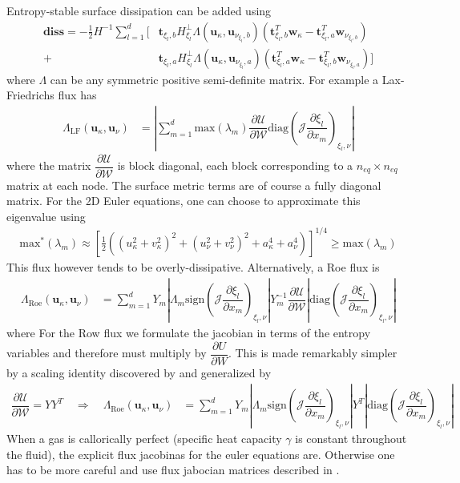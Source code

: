 \documentclass[12pt,a4paper]{article}
\newcommand{\pder}[2][]{\dfrac{\partial #1}{\partial #2}} %
\newcommand{\fn}[1]{\mathcal{#1}} %
\newcommand{\fnb}[1]{\bm{\mathcal{#1}}} %
\begin{document}
Entropy-stable surface dissipation can be added using
\begin{align*}
 \textbf{diss} = - \frac{1}{2} H^{-1} \sum_{l=1}^d \bigg[ & \bm{t}_{\xi_l, b} H^{\bot}_{\xi_l} \Lambda ( \bm{u}_\kappa , \bm{u}_{\nu_{\xi_l},b} ) 
 \left( \bm{t}_{\xi_l, b}^T \bm{w}_\kappa - \bm{t}_{\xi_l, a}^T \bm{w}_{\nu_{\xi_l , b}} \right) \\ + 
& \bm{t}_{\xi_l, a} H^{\bot}_{\xi_l} \Lambda ( \bm{u}_\kappa , \bm{u}_{\nu_{\xi_l},a} ) 
 \left( \bm{t}_{\xi_l, a}^T \bm{w}_\kappa - \bm{t}_{\xi_l, b}^T \bm{w}_{\nu_{\xi_l , a}} \right) \bigg]
\end{align*}
where $\Lambda$ can be any symmetric positive semi-definite matrix. For example a Lax-Friedrichs flux has
\begin{align*}
\Lambda_{\text{LF}} ( \bm{u}_\kappa , \bm{u}_\nu ) &= \left\vert \sum_{m=1}^d \text{max} \left( {\lambda_m} \right) \pder[\fnb{U}]{\fnb{W}} \text{diag} \left( \fn{J} \pder[\xi_l]{x_m} \right)_{\xi_l,\nu} \right\vert 
\end{align*}
where the matrix $\pder[\fnb{U}]{\fnb{W}}$ is block diagonal, each block corresponding to a $n_{eq} \times n_{eq}$ matrix at each node. The surface metric terms are of course a fully diagonal matrix. For the 2D Euler equations, one can choose to approximate this eigenvalue using \cite{carpenter_entropy_2014}
\begin{align*}
\text{max}^* \left( {\lambda_m} \right) \approx \left[ \frac{1}{2} \left( \left( u_\kappa^2 + v_\kappa^2 \right)^2 + \left( u_\nu^2 + v_\nu^2 \right)^2 + a_\kappa^4 + a_\nu^4 \right) \right]^{1/4} \geq \text{max} \left( {\lambda_m} \right)
\end{align*}
This flux however tends to be overly-dissipative. Alternatively, a Roe flux is
\begin{align*}
\Lambda_{\text{Roe}} ( \bm{u}_\kappa , \bm{u}_\nu ) &=  \sum_{m=1}^d Y_m \left\vert \Lambda_m \text{sign} \left( \fn{J} \pder[\xi_l]{x_m} \right)_{\xi_l,\nu} \right\vert Y^{-1}_m \pder[\fnb{U}]{\fnb{W}} \left\vert \text{diag} \left( \fn{J} \pder[\xi_l]{x_m} \right)_{\xi_l,\nu} \right\vert
\end{align*}
where 
For the Row flux we formulate the jacobian in terms of the entropy variables and therefore must multiply by $\pder[U]{W}$. This is made remarkably simpler by a scaling identity discovered by \cite{merriam_entropy-based_1989} and generalized by \cite{barth_numerical_1999}
\begin{align*}
\pder[\fnb{U}]{\fnb{W}} = Y Y^T \quad \Rightarrow \quad \Lambda_{\text{Roe}} ( \bm{u}_\kappa , \bm{u}_\nu ) &=  \sum_{m=1}^d Y_m \left\vert \Lambda_m \text{sign} \left( \fn{J} \pder[\xi_l]{x_m} \right)_{\xi_l,\nu} \right\vert Y^T \left\vert \text{diag} \left( \fn{J} \pder[\xi_l]{x_m} \right)_{\xi_l,\nu} \right\vert
\end{align*}
 When a gas is callorically perfect (specific heat capacity $\gamma$ is constant throughout the fluid), the explicit flux jacobinas for the euler equations are. Otherwise one has to be more careful and use flux jabocian matrices described in \cite{fisher_high_2012}.
\end{document}
